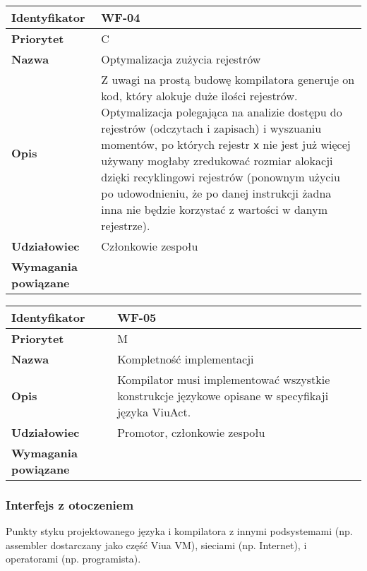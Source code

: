 \vspace{1em}

\begin{tabular}{ | l | l | }
    \hline
    \textbf{Identyfikator} & \parbox[t]{11cm}{WF-04} \\
    \hline
    \textbf{Priorytet} & C \\
    \hline
    \textbf{Nazwa} & Optymalizacja zużycia rejestrów \\
    \hline
    \textbf{Opis} & \parbox[t]{11cm}{
        Z uwagi na prostą budowę kompilatora generuje on kod, który alokuje duże ilości rejestrów.
        Optymalizacja polegająca na analizie dostępu do rejestrów (odczytach i zapisach) i wyszuaniu
        momentów, po których rejestr \texttt{x} nie jest już więcej używany mogłaby zredukować rozmiar
        alokacji dzięki recyklingowi rejestrów (ponownym użyciu po udowodnieniu, że po danej instrukcji
        żadna inna nie będzie korzystać z wartości w danym rejestrze).
    } \\
    \hline
    \textbf{Udziałowiec} & Członkowie zespołu \\
    \hline
    \textbf{Wymagania powiązane} & \phantom{} \\
    \hline
\end{tabular}

\vspace{1em}

\begin{tabular}{ | l | l | }
    \hline
    \textbf{Identyfikator} & \parbox[t]{11cm}{WF-05} \\
    \hline
    \textbf{Priorytet} & M \\
    \hline
    \textbf{Nazwa} & Kompletność implementacji \\
    \hline
    \textbf{Opis} & \parbox[t]{11cm}{
        Kompilator musi implementować wszystkie konstrukcje językowe opisane w specyfikaji języka
        ViuAct.
    } \\
    \hline
    \textbf{Udziałowiec} & Promotor, członkowie zespołu \\
    \hline
    \textbf{Wymagania powiązane} & \phantom{} \\
    \hline
\end{tabular}

\subsubsection{Interfejs z otoczeniem}

Punkty styku projektowanego języka i kompilatora z innymi podsystemami (np. assembler dostarczany jako
część Viua VM), sieciami (np. Internet), i operatorami (np. programista).

